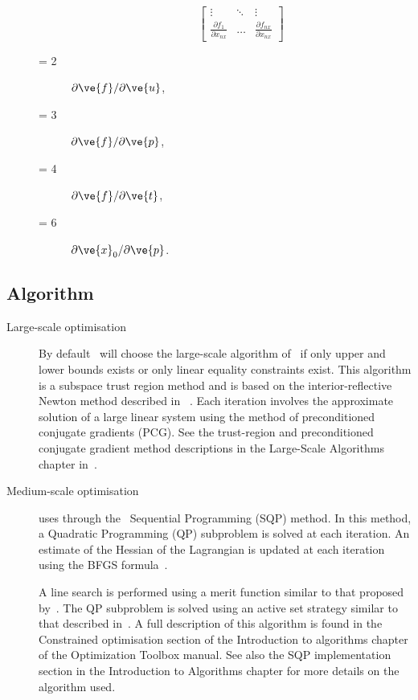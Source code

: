 \begin{description}
\begin{description}
\begin{equation*}
\begin{bmatrix}
      \vdots & \ddots & \vdots \\
      \frac{\displaystyle \partial{f_{1}}}{\displaystyle \partial{x_{nx}}}
      & \ldots &
      \frac{\displaystyle \partial{f_{nx}}}{\displaystyle \partial{x_{nx}}}
      \end{bmatrix}
    \end{equation*}
  \item[\argfun{flag} = 2] $\partial \ve{f}/\partial \ve{u}$,
  \item[\argfun{flag} = 3] $\partial \ve{f}/\partial \ve{p}$,
  \item[\argfun{flag} = 4] $\partial \ve{f}/\partial \ve{t}$,
  \item[\argfun{flag} = 6] $\partial \ve{x}_0/\partial \ve{p}$.
  \end{description}
  {\small }
\end{description}


\subsection{Algorithm}

\begin{description}
\item[Large-scale optimisation] By default~ will choose
  the large-scale algorithm of~ if only upper and lower
  bounds exists or only linear equality constraints exist. This
  algorithm is a subspace trust region method and is based on the
  interior-reflective Newton method described in ~\cite{col96}. Each
  iteration involves the approximate solution of a large linear system
  using the method of preconditioned conjugate gradients (PCG). See
  the trust-region and preconditioned conjugate gradient method
  descriptions in the Large-Scale Algorithms chapter in~\cite{col99}.
\item[Medium-scale optimisation]  uses through
  the~ Sequential Programming (SQP) method. In this
  method, a Quadratic Programming (QP) subproblem is solved at each
  iteration. An estimate of the Hessian of the Lagrangian is updated
  at each iteration using the BFGS formula~\cite{col96}.

  A line search is performed using a merit function similar to that
  proposed by~\cite{han77}. The QP subproblem is solved using an
  active set strategy similar to that described in~\cite{gil81}.
  A full description of this algorithm is found in the Constrained
  optimisation section of the Introduction to algorithms chapter of
  the Optimization Toolbox manual. See also the SQP implementation
  section in the Introduction to Algorithms chapter for more details
  on the algorithm used.
\end{description}

